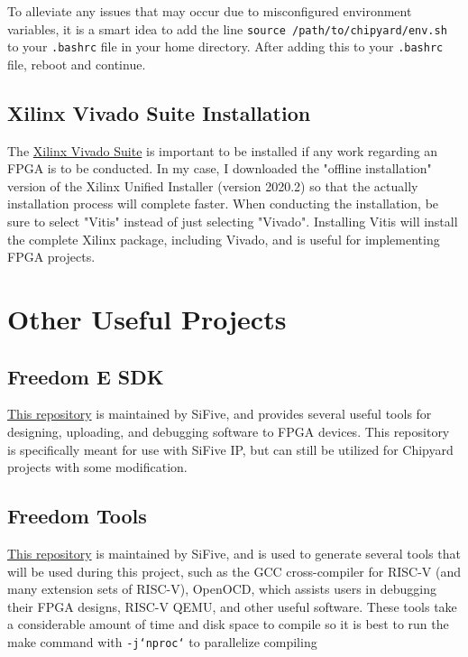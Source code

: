 \documentclass[oneside]{book}
\begin{document}
	To alleviate any issues that may occur due to misconfigured environment variables, it is a smart idea to add the line \texttt{source /path/to/chipyard/env.sh} to your \texttt{.bashrc} file in your home directory. After adding this to your \texttt{.bashrc} file, reboot and continue.
	
	\subsection{Xilinx Vivado Suite Installation}
	The \hyperref{https://www.xilinx.com/support/download.html}{}{}{Xilinx Vivado Suite} is important to be installed if any work regarding an FPGA is to be conducted. In my case, I downloaded the "offline installation" version of the Xilinx Unified Installer (version 2020.2) so that the actually installation process will complete faster. When conducting the installation, be sure to select "Vitis" instead of just selecting "Vivado". Installing Vitis will install the complete Xilinx package, including Vivado, and is useful for implementing FPGA projects.
	
	\section{Other Useful Projects}
	\subsection{Freedom E SDK}
	\hyperref{https://github.com/sifive/freedom-e-sdk}{}{}{This repository} is maintained by SiFive, and provides several useful tools for designing, uploading, and debugging software to FPGA devices. This repository is specifically meant for use with SiFive IP, but can still be utilized for Chipyard projects with some modification.
	\subsection{Freedom Tools}
	\hyperref{https://github.com/sifive/freedom-tools}{}{}{This repository} is maintained by SiFive, and is used to generate several tools that will be used during this project, such as the GCC cross-compiler for RISC-V (and many extension sets of RISC-V), OpenOCD, which assists users in debugging their FPGA designs, RISC-V QEMU, and other useful software. These tools take a considerable amount of time and disk space to compile so it is best to run the make command with \texttt{-j`nproc`} to parallelize compiling
	
\end{document}
